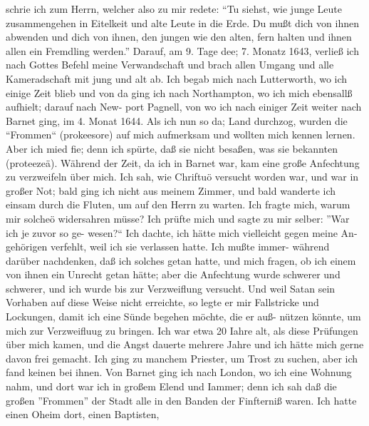 schrie ich zum Herrn, welcher also zu mir redete: "`Tu siehst, wie
junge Leute zusammengehen in Eitelkeit und alte Leute in die
Erde. Du mußt dich von ihnen abwenden und dich von ihnen,
den jungen wie den alten, fern halten und ihnen allen ein
Fremdling werden."'
Darauf, am 9. Tage dee; 7. Monatz 1643, verließ ich nach
Gottes Befehl meine Verwandschaft und brach allen Umgang und
alle Kameradschaft mit jung und alt ab. Ich begab mich nach
Lutterworth, wo ich einige Zeit blieb und von da ging ich nach
Northampton, wo ich mich ebensallß aufhielt; darauf nach New-
port Pagnell, von wo ich nach einiger Zeit weiter nach Barnet
ging, im 4. Monat 1644. Als ich nun so da; Land durchzog,
wurden die "`Frommen"` (prokeesore) auf mich aufmerksam und
wollten mich kennen lernen. Aber ich mied fie; denn ich spürte,
daß sie nicht besaßen, was sie bekannten (proteezeä). Während
der Zeit, da ich in Barnet war, kam eine große Anfechtung zu
verzweifeln über mich. Ich sah, wie Chriftuö versucht worden
war, und war in großer Not; bald ging ich nicht aus meinem
Zimmer, und bald wanderte ich einsam durch die Fluten, um auf
den Herrn zu warten.
Ich fragte mich, warum mir solcheö widersahren müsse? Ich
prüfte mich und sagte zu mir selber: "'War ich je zuvor so ge-
wesen?"` Ich dachte, ich hätte mich vielleicht gegen meine An-
gehörigen verfehlt, weil ich sie verlassen hatte. Ich mußte immer-
während darüber nachdenken, daß ich solches getan hatte, und
mich fragen, ob ich einem von ihnen ein Unrecht getan hätte;
aber die Anfechtung wurde schwerer und schwerer, und ich wurde
bis zur Verzweiflung versucht. Und weil Satan sein Vorhaben
auf diese Weise nicht erreichte, so legte er mir Fallstricke und
Lockungen, damit ich eine Sünde begehen möchte, die er auß-
nützen könnte, um mich zur Verzweifluug zu bringen. Ich war
etwa 20 Iahre alt, als diese Prüfungen über mich kamen, und
die Angst dauerte mehrere Jahre und ich hätte mich gerne davon
frei gemacht. Ich ging zu manchem Priester, um Trost zu suchen,
aber ich fand keinen bei ihnen.
Von Barnet ging ich nach London, wo ich eine Wohnung nahm,
und dort war ich in großem Elend und Iammer; denn ich sah
daß die großen "'Frommen"' der Stadt alle in den Banden der
Finfterniß waren. Ich hatte einen Oheim dort, einen Baptisten,




